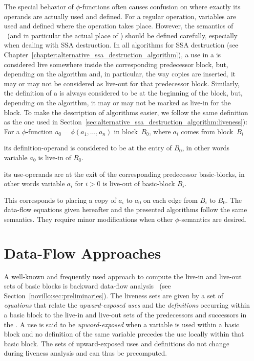 The special behavior of $\phi$-functions often causes confusion on where exactly its operands are actually used and defined.
For a regular operation, variables are used and defined where the operation takes place.
However, the semantics of \phifuns\ (and in particular the actual place of \phiuses) should be defined carefully, especially when dealing with SSA destruction.
In all algorithms for SSA destruction (see Chapter~\ref{chapter:alternative_ssa_destruction_algorithm}), a use in a \phifun is considered live somewhere inside the corresponding predecessor block, but, depending on the algorithm and, in particular, the way copies are inserted, it may or may not be considered as live-out for that predecessor block.
Similarly, the definition of a \phifun is always considered to be at the beginning of the block, but, depending on the algorithm, it may or may not be marked as live-in for the block.
To make the description of algorithms easier, we follow the same definition as the one used in Section~\ref{sec:alternative_ssa_destruction_algorithm:liveness}):
For a $\phi$-function $a_0 = \phi(a_1, \ldots, a_n)$ in block~$B_0$, where $a_i$ comes from block~$B_i$
\begin{compactitem}
\item
	its definition-operand is considered to be at the entry of $B_0$, in other words variable $a_0$ is live-in of $B_0$.
\item
	its use-operands are at the exit of the corresponding predecessor basic-blocks, in other words variable $a_i$ for $i>0$ is live-out of basic-block $B_i$.
\end{compactitem}
This corresponds to placing a copy of $a_i$ to $a_0$ on each edge from $B_i$ to $B_0$.
The data-flow equations given hereafter and the presented algorithms follow the same semantics.
They require minor modifications when other $\phi$-semantics are desired.

\section{Data-Flow Approaches}
\label{sec:data-flow}

A well-known and frequently used approach to compute the live-in and live-out sets of basic blocks is backward data-flow analysis~ (see Section~\ref{novillo:sec:preliminaries}).
The liveness sets are given by a set of \emph{equations} that relate the \emph{upward-exposed uses} and the \emph{definitions} occurring within a basic block to the live-in and live-out sets of the predecessors and successors in the \@CFG.
A use is said to be \emph{upward-exposed} when a variable is used within a basic block and no definition of the same variable precedes the use locally within that basic block.
The sets of upward-exposed uses and definitions do not change during liveness analysis and can thus be precomputed.

